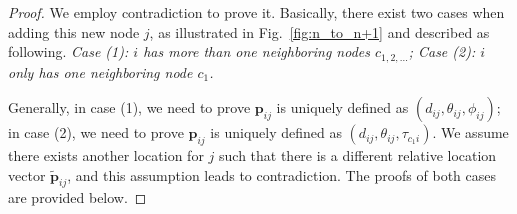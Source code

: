 \documentclass{article}
\begin{document}
\begin{proof}
We employ contradiction to prove it. Basically, there exist two cases when adding this new node $j$,
as illustrated in Fig.~\ref{fig:n_to_n+1} and described as following.
\emph{Case (1): $i$ has more than one neighboring nodes $c_{1,2,...}$;
Case (2): $i$ only has one neighboring node $c_1$.}

Generally, in case (1), we need to prove $\textbf{p}_{ij}$ is uniquely defined as $(d_{ij}, \theta_{ij}, \phi_{ij})$; in case (2), we need to prove $\textbf{p}_{ij}$ is uniquely defined as $(d_{ij}, \theta_{ij}, \tau_{c_1i})$.
We assume there exists another location for $j$ such that there is a different relative location vector
$\widetilde{\textbf{p}}_{ij}$, and this assumption leads to contradiction.
The proofs of both cases are provided below.
\end{proof}
\end{document}
